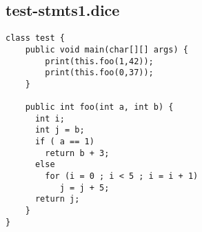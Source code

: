 \subsection{test-stmts1.dice}
\begin{verbatim}
class test {
	public void main(char[][] args) {
		print(this.foo(1,42));
	 	print(this.foo(0,37));
	}

	public int foo(int a, int b) {
	  int i;
	  int j = b;
	  if ( a == 1)
	    return b + 3;
	  else
	    for (i = 0 ; i < 5 ; i = i + 1)
	       j = j + 5;
	  return j;  
	}  
}
\end{verbatim}